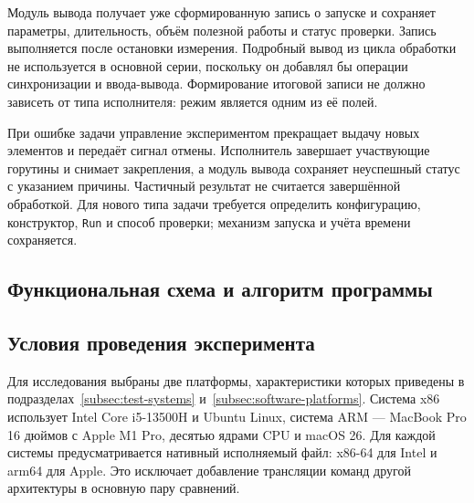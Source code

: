 Модуль вывода получает уже сформированную запись о запуске и сохраняет параметры, длительность,
  объём полезной работы и статус проверки. Запись выполняется после остановки измерения.
  Подробный вывод из цикла обработки не используется в основной серии, поскольку он добавлял бы
  операции синхронизации и ввода-вывода. Формирование итоговой записи не должно зависеть от типа
  исполнителя: режим является одним из её полей.

При ошибке задачи управление экспериментом прекращает выдачу новых элементов и передаёт сигнал
  отмены. Исполнитель завершает участвующие горутины и снимает закрепления, а модуль вывода
  сохраняет неуспешный статус с указанием причины. Частичный результат не считается завершённой
  обработкой. Для нового типа задачи требуется определить конфигурацию, конструктор,
  \texttt{Run} и способ проверки; механизм запуска и учёта времени сохраняется.


\subsection{Функциональная схема и алгоритм программы}
\label{subsec:program-schemes}


\subsection{Условия проведения эксперимента}
\label{subsec:experiment-conditions}

Для исследования выбраны две платформы, характеристики которых приведены
  в подразделах~\ref{subsec:test-systems} и~\ref{subsec:software-platforms}.
  Система x86 использует Intel Core i5-13500H и Ubuntu Linux, система ARM — MacBook Pro
  16 дюймов с Apple M1 Pro, десятью ядрами CPU и macOS 26.
  Для каждой системы предусматривается нативный исполняемый файл: x86-64 для Intel
  и arm64 для Apple. Это исключает добавление трансляции команд другой архитектуры
  в основную пару сравнений.

